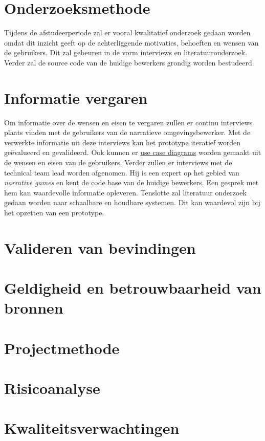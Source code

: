 \documentclass{report}
\begin{document}
\section{Onderzoeksmethode}
Tijdens de afstudeerperiode zal er vooral kwalitatief onderzoek gedaan worden omdat dit inzicht geeft op de achterliggende motivaties, behoeften en wensen van de gebruikers. Dit zal gebeuren in de vorm interviews en literatuuronderzoek. Verder zal de source code van de huidige bewerkers grondig worden bestudeerd. 

\section{Informatie vergaren}
Om informatie over de wensen en eisen te vergaren zullen er continu interviews plaats vinden met de gebruikers van de narratieve omgevingsbewerker. Met de verwerkte informatie uit deze interviews kan het prototype iteratief worden ge{\"e}valueerd en gevalideerd. Ook kunnen er \href{http://www.agilemodeling.com/artifacts/useCaseDiagram.htm}{use case diagrams} worden gemaakt uit de wensen en eisen van de gebruikers.
Verder zullen er interviews met de technical team lead worden afgenomen. Hij is een expert op het gebied van \emph{narrative games} en kent de code base van de huidige bewerkers. Een gesprek met hem kan waardevolle informatie opleveren.
Tenslotte zal literatuur onderzoek gedaan worden naar schaalbare en houdbare systemen. Dit kan waardevol zijn bij het opzetten van een prototype.

\section{Valideren van bevindingen}

\section{Geldigheid en betrouwbaarheid van bronnen}

\section{Projectmethode}

\section{Risicoanalyse}

\section{Kwaliteitsverwachtingen}
\end{document}
